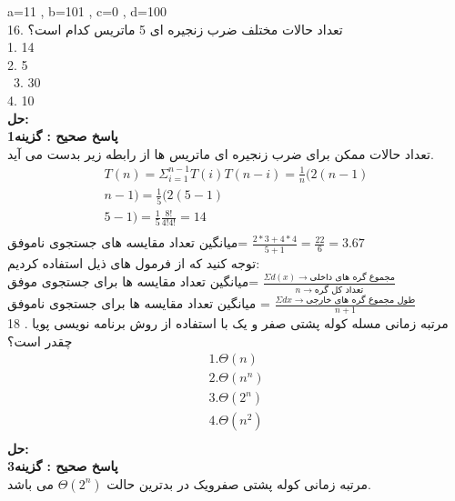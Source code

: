\documentclass{book}
\begin{document}
  a=11 , b=101 , c=0 , d=100 \\
16. تعداد حالات مختلف ضرب زنجیره ای 5 ماتریس کدام است؟ \\
1. 14 \\ 2. 5 \\\ 3. 30 \\ 4. 10\\
\textbf{حل:}\\
\textbf{پاسخ صحیح : گزینه1}\\
تعداد حالات ممکن برای ضرب زنجیره ای ماتریس ها از رابطه زیر بدست می آید. \\
\begin{align*}
T(n)=\Sigma_{i=1}^{n-1}T(i)T(n-i)=\frac{1}{n}(2(n-1)\\n-1)=\frac{1}{5}(2(5-1)\\5-1)=\frac{1}{5}\frac{8!}{4!4!}=14 \\
\end{align*}
میانگین تعداد مقایسه های جستجوی ناموفق= $\frac{2*3+4*4}{5+1}=\frac{22}{6}=3.67$\\
توجه کنید که از فرمول های ذیل استفاده کردیم:\\
میانگین تعداد مقایسه ها برای جستجوی موفق= $\frac{\Sigma d(x) \rightarrow \text{مجموع گره های داخلی}}{n \rightarrow \text{تعداد کل گره} 
}$\\
میانگین تعداد مقایسه ها برای جستجوی ناموفق =  $\frac{\Sigma dx \rightarrow \text{طول مجموع  گره های خارجی}}{n+1}
$\\
18 . مرتبه زمانی مسله کوله پشتی صفر و یک با استفاده از روش برنامه نویسی پویا چقدر است؟ \\
\begin{align*}
1. \Theta (n) \\ 2. \Theta (n^n) \\ 3. \Theta (2^n) \\ 4. \Theta (n^2) \\
\end{align*}
\textbf{حل:}\\
\textbf{پاسخ صحیح : گزینه3}\\
مرتبه زمانی کوله پشتی صفرویک در بدترین حالت $\Theta(2^n)$  می باشد.\\
\end{document}
